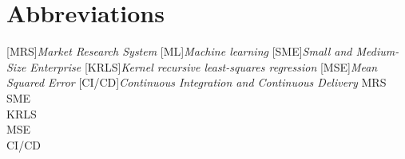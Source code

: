 \chapter*{Abbreviations}

[MRS]{\emph{Market Research System}}
[ML]{\emph{Machine learning}}
[SME]{\emph{Small and Medium-Size Enterprise}}
[KRLS]{\emph{Kernel recursive least-squares regression}}
[MSE]{\emph{Mean Squared Error}}
[CI/CD]{\emph{Continuous Integration and Continuous Delivery}}
\ac{MRS} \\
\ac{SME} \\
\ac{KRLS} \\
\ac{MSE} \\
\ac{CI/CD} \\